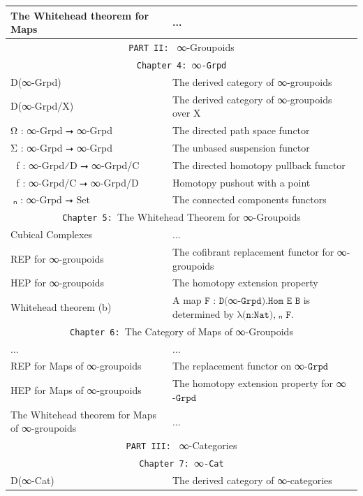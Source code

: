 \documentclass{book}
\theoremstyle{definition}
\begin{document}
{\begin{longtable}{|| l || l ||}
\hline
The Whitehead theorem for Maps & ... \\
\hline \hline
\multicolumn{2}{||c||}{\texttt{PART II: } ∞-Groupoids} \\
\hline \hline 
\multicolumn{2}{||c||}{\texttt{Chapter 4: }∞\texttt{-Grpd}}\\
\hline \hline
D(∞-Grpd) & The derived category of ∞-groupoids \\
\hline
D(∞-Grpd/X) & The derived category of ∞-groupoids over X \\
\hline
Ω⃡ : ∞-Grpd ⭢ ∞-Grpd & The directed path space functor \\
 \hline 
Σ⃡ : ∞-Grpd ⭢ ∞-Grpd & The unbased suspension functor \\
 \hline 
ω⃡ f : ∞-Grpd⁄D ⭢ ∞-Grpd/C & The directed homotopy pullback functor\\
\hline 
σ⃡ f : ∞-Grpd/C ⭢ ∞-Grpd/D & Homotopy pushout with a point \\
 \hline 
π⃡ₙ : ∞-Grpd ⭢ Set & The connected components functors\\
 \hline \hline
 \multicolumn{2}{||c||}{\texttt{Chapter 5: }The Whitehead Theorem for ∞-Groupoids} \\
\hline \hline
Cubical Complexes & ...\\
\hline
REP for ∞-groupoids & The cofibrant replacement functor for ∞-groupoids\\
\hline
HEP for ∞-groupoids & The homotopy extension property\\
\hline
Whitehead theorem (b) & A map $\texttt{F : D(}$∞$\texttt{-Grpd).Hom E B}$ is determined by $\texttt{λ(n:Nat),}$π⃡ₙ
$\texttt{F}$. \\
\hline \hline
\multicolumn{2}{||c||}{\texttt{Chapter 6: }The Category of Maps of ∞-Groupoids} \\
\hline \hline
... & ...\\
\hline
REP for Maps of ∞-groupoids & The replacement functor on ∞$\texttt{-Grpd}$ \\
\hline
HEP for Maps of ∞-groupoids & The homotopy extension property for ∞$\texttt{-Grpd}$\\
 \hline 
The Whitehead theorem for Maps of ∞-groupoids & ... \\
\hline \hline
 \multicolumn{2}{||c||}{\texttt{PART III: } ∞-Categories} \\
\hline \hline
\multicolumn{2}{||c||}{\texttt{Chapter 7: }∞\texttt{-Cat}} \\
\hline \hline
D(∞-Cat) & The derived category of ∞-categories \\
\hline

\end{longtable}}
\end{document}
